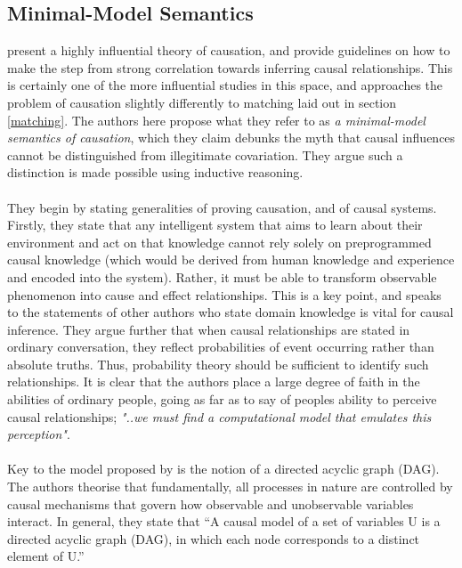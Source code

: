 {\subsection{Minimal-Model Semantics}
{\cite{pearl1995theory} present a highly influential theory of causation, and provide guidelines on how to make the step from strong correlation towards inferring causal relationships. This is certainly one of the more influential studies in this space, and approaches the problem of causation slightly differently to matching laid out in section \ref{matching}. The authors here propose what they refer to as {\it a minimal-model semantics of causation}, which they claim debunks the myth that causal influences cannot be distinguished from illegitimate covariation. They argue such a distinction is made possible using inductive reasoning.\\\\
They begin by stating generalities of proving causation, and of causal systems. Firstly, they state that any intelligent system that aims to learn about their environment and act on that knowledge cannot rely solely on preprogrammed causal knowledge (which would be derived from human knowledge and experience and encoded into the system). Rather, it must be able to transform observable phenomenon into cause and effect relationships. This is a key point, and speaks to the statements of other authors who state domain knowledge is vital for causal inference. They argue further that when causal relationships are stated in ordinary conversation, they reflect probabilities of event occurring rather than absolute truths. Thus, probability theory should be sufficient to identify such relationships. It is clear that the authors place a large degree of faith in the abilities of ordinary people, going as far as to say of peoples ability to perceive causal relationships; {\it "..we must find a computational model that emulates this perception"}.\\\\
Key to the model proposed by \cite{pearl1995theory} is the notion of a directed acyclic graph (DAG). The authors theorise that fundamentally, all processes in nature are controlled by causal mechanisms that govern how observable and unobservable variables interact. In general, they state that
``A causal model of a set of variables U is a directed acyclic graph (DAG), in which each node corresponds to a distinct element of U.'' \cite {pearl1995theory} \\\\
}}
